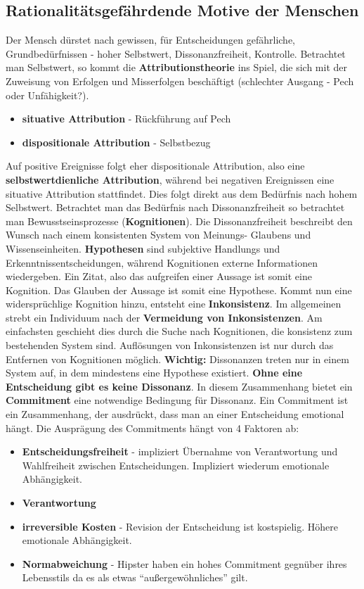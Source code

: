 \subsection{Rationalitätsgefährdende Motive der Menschen}
Der Mensch dürstet nach gewissen, für Entscheidungen gefährliche,
Grundbedürfnissen - hoher Selbstwert, Dissonanzfreiheit, Kontrolle.
Betrachtet man Selbstwert, so kommt die \textbf{Attributionstheorie}
ins Spiel, die sich mit der Zuweisung von Erfolgen und Misserfolgen
beschäftigt (schlechter Ausgang - Pech oder Unfähigkeit?).
\begin{itemize}
    \item \textbf{situative Attribution} - Rückführung auf Pech
    \item \textbf{dispositionale Attribution} - Selbstbezug
\end{itemize}
Auf positive Ereignisse folgt eher dispositionale Attribution, also eine
\textbf{selbstwertdienliche Attribution}, während bei negativen
Ereignissen eine situative Attribution stattfindet. Dies folgt direkt
aus dem Bedürfnis nach hohem Selbstwert.
Betrachtet man das Bedürfnis nach Dissonanzfreiheit so betrachtet man
Bewusstseinsprozesse (\textbf{Kognitionen}). Die Dissonanzfreiheit
beschreibt den Wunsch nach einem konsistenten System von Meinungs- Glaubens und
Wissenseinheiten. \textbf{Hypothesen} sind subjektive Handlungs und
Erkenntnissentscheidungen, während Kognitionen externe Informationen
wiedergeben. Ein Zitat, also das aufgreifen einer Aussage ist somit eine
Kognition. Das Glauben der Aussage ist somit eine Hypothese. Kommt nun eine
widersprüchlige Kognition hinzu, entsteht eine \textbf{Inkonsistenz}.
Im allgemeinen strebt ein Individuum nach der \textbf{Vermeidung von
Inkonsistenzen}. Am einfachsten geschieht dies durch die Suche
nach Kognitionen, die konsistenz zum bestehenden System sind. Auflösungen
von Inkonsistenzen ist nur durch das Entfernen von Kognitionen möglich.
\textbf{Wichtig:} Dissonanzen treten nur in einem System auf, in dem mindestens
eine Hypothese existiert. \textbf{Ohne eine Entscheidung gibt es keine
Dissonanz}. In diesem Zusammenhang bietet ein \textbf{Commitment} eine
notwendige Bedingung für Dissonanz. Ein Commitment ist ein Zusammenhang,
der ausdrückt, dass man an einer Entscheidung emotional hängt. Die Ausprägung
des Commitments hängt von 4 Faktoren ab:
\begin{itemize}
    \item \textbf{Entscheidungsfreiheit} - impliziert Übernahme von Verantwortung
        und Wahlfreiheit zwischen Entscheidungen. Impliziert wiederum
        emotionale Abhängigkeit.
    \item \textbf{Verantwortung}
    \item \textbf{irreversible Kosten} - Revision der Entscheidung
        ist kostspielig. Höhere emotionale Abhängigkeit.
    \item \textbf{Normabweichung} - Hipster haben ein hohes Commitment gegnüber
        ihres Lebensstils da es als etwas ``außergewöhnliches'' gilt.
\end{itemize}

